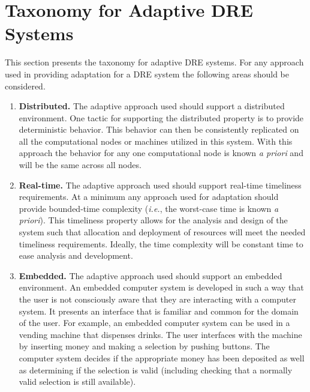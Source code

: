 \documentclass[conference]{IEEEtran}
\begin{document}
\section{Taxonomy for Adaptive DRE Systems}
\label{taxonomy}
This section presents the taxonomy for adaptive DRE systems. For any approach used in providing adaptation for a DRE system the following areas should be considered.
\begin{enumerate}
\item \textbf{Distributed.} The adaptive approach used should support a distributed environment. One tactic for supporting the distributed property is to provide deterministic behavior. This behavior can then be consistently replicated on all the computational nodes or machines utilized in this system. With this approach the behavior for any one computational node is known \emph{a priori} and will be the same across all nodes.

\item \textbf{Real-time.} The adaptive approach used should support real-time timeliness requirements. At a minimum any approach used for adaptation should provide bounded-time complexity (\emph{i.e.}, the worst-case time is known \emph{a priori}). This timeliness property allows for the analysis and design of the system such that allocation and deployment of resources will meet the needed timeliness requirements. Ideally, the time complexity will be constant time to ease analysis and development.

\item \textbf{Embedded.} The adaptive approach used should support an embedded environment. An embedded computer system is developed in such a way that the user is not consciously aware that they are interacting with a computer system. It presents an interface that is familiar and common for the domain of the user. For example, an embedded computer system can be used in a vending machine that dispenses drinks. The user interfaces with the machine by inserting money and making a selection by pushing buttons. The computer system decides if the appropriate money has been deposited as well as determining if the selection is valid (including checking that a normally valid selection is still available).


\end{enumerate}
\end{document}
